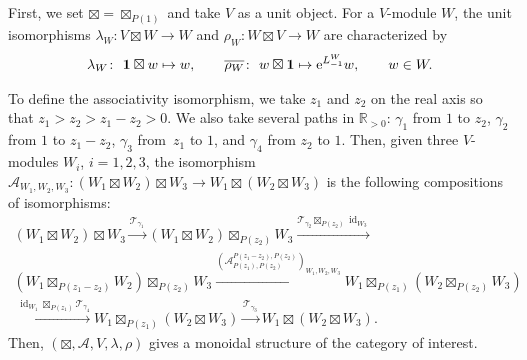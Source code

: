 \documentclass[10pt,a4paper]{amsart}
\numberwithin{equation}{section}
\newcommand{\ol}[1]{\overline{#1}}
\newcommand{\id}{\operatorname{id}}
\newcommand{\bR}{\mathbb{R}}
\newcommand{\cA}{\mathcal{A}}
\newcommand{\cT}{\mathcal{T}}
\newcommand{\voagen}{V}
\newcommand{\voamodgen}{W}
\newcommand{\voavac}{\mathbf{1}}
\newcommand{\vmodvec}{w}
\begin{document}
First, we set $\boxtimes=\boxtimes_{P(1)}$ and take $\voagen$ as a unit object.
For a $\voagen$-module $\voamodgen$, the unit isomorphisms $\lambda_{\voamodgen}\colon \voagen\boxtimes\voamodgen\to\voamodgen$ and $\rho_{\voamodgen}\colon\voamodgen\boxtimes \voagen\to \voamodgen$ are characterized by
\begin{gather*}
 \lambda_{\voamodgen}\colon\ \voavac\boxtimes \vmodvec\mapsto \vmodvec,\qquad \ol{\rho_{\voamodgen}}\colon\ \vmodvec\boxtimes\voavac\mapsto {\rm e}^{L^{\voamodgen}_{-1}}\vmodvec,\qquad \vmodvec\in\voamodgen.
\end{gather*}

To define the associativity isomorphism, we take $z_{1}$ and $z_{2}$ on the real axis so that $z_{1}>z_{2}>z_{1}-z_{2}>0$.
We also take several paths in $\bR_{>0}$: $\gamma_{1}$ from $1$ to $z_{2}$, $\gamma_{2}$ from $1$ to $z_{1}-z_{2}$, $\gamma_{3}$ from~$z_{1}$ to $1$, and $\gamma_{4}$ from $z_{2}$ to $1$.
Then, given three $\voagen$-modules $\voamodgen_{i}$, $i=1,2,3$, the isomorphism $\cA_{\voamodgen_{1},\voamodgen_{2},\voamodgen_{3}}\colon (\voamodgen_{1}\boxtimes \voamodgen_{2})\boxtimes \voamodgen_{3}\to \voamodgen_{1}\boxtimes (\voamodgen_{2}\boxtimes \voamodgen_{3})$ is the following compositions of isomorphisms:
\begin{gather*}
 (\voamodgen_{1}\boxtimes \voamodgen_{2})\boxtimes \voamodgen_{3}
 \xrightarrow{\cT_{\gamma_{1}}}
 (\voamodgen_{1}\boxtimes \voamodgen_{2})\boxtimes_{P(z_{2})} \voamodgen_{3}
 \xrightarrow{\cT_{\gamma_{2}}\boxtimes_{P(z_{2})}\id_{\voamodgen_{3}}} \\
 (\voamodgen_{1}\boxtimes_{P(z_{1}-z_{2})} \voamodgen_{2})\boxtimes_{P(z_{2})} \voamodgen_{3}
 \xrightarrow{(\cA_{P(z_{1}),P(z_{2})}^{P(z_{1}-z_{2}),P(z_{2})})_{\voamodgen_{1},\voamodgen_{2},\voamodgen_{3}}}
 \voamodgen_{1}\boxtimes_{P(z_{1})} (\voamodgen_{2}\boxtimes_{P(z_{2})} \voamodgen_{3}) \\
 \xrightarrow{\id_{\voamodgen_{1}}\boxtimes_{P(z_{1})}\cT_{\gamma_{4}}}
 \voamodgen_{1}\boxtimes_{P(z_{1})} (\voamodgen_{2}\boxtimes \voamodgen_{3})
 \xrightarrow{\cT_{\gamma_{3}}}
 \voamodgen_{1}\boxtimes (\voamodgen_{2}\boxtimes \voamodgen_{3}).
\end{gather*}
Then, $(\boxtimes, \cA, \voagen, \lambda,\rho)$ gives a monoidal structure of the category of interest.
\end{document}
